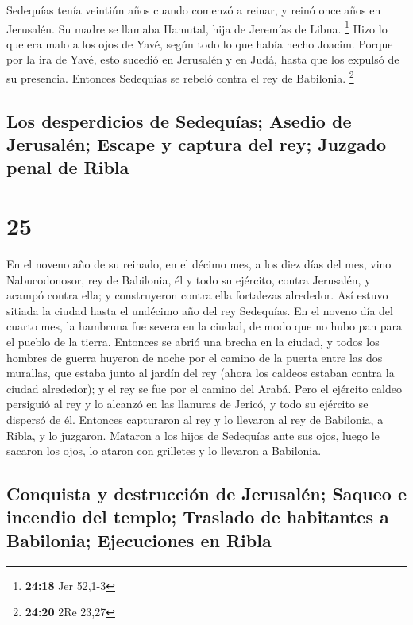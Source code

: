  Sedequías tenía veintiún años cuando comenzó a reinar, y
reinó once años en Jerusalén. Su madre se llamaba Hamutal, hija de
Jeremías de Libna. \footnote{\textbf{24:18} Jer 52,1-3} 
Hizo lo que era malo a los ojos de Yavé, según todo lo que había hecho
Joacim.  Porque por la ira de Yavé, esto sucedió en
Jerusalén y en Judá, hasta que los expulsó de su presencia. Entonces
Sedequías se rebeló contra el rey de Babilonia. \footnote{\textbf{24:20}
  2Re 23,27}

\hypertarget{los-desperdicios-de-sedequuxedas-asedio-de-jerusaluxe9n-escape-y-captura-del-rey-juzgado-penal-de-ribla}{%
\subsection{Los desperdicios de Sedequías; Asedio de Jerusalén; Escape y
captura del rey; Juzgado penal de
Ribla}\label{los-desperdicios-de-sedequuxedas-asedio-de-jerusaluxe9n-escape-y-captura-del-rey-juzgado-penal-de-ribla}}

\hypertarget{section-24}{%
\section{25}\label{section-24}}

 En el noveno año de su reinado, en el décimo mes, a los
diez días del mes, vino Nabucodonosor, rey de Babilonia, él y todo su
ejército, contra Jerusalén, y acampó contra ella; y construyeron contra
ella fortalezas alrededor.  Así estuvo sitiada la ciudad
hasta el undécimo año del rey Sedequías.  En el noveno día
del cuarto mes, la hambruna fue severa en la ciudad, de modo que no hubo
pan para el pueblo de la tierra.  Entonces se abrió una
brecha en la ciudad, y todos los hombres de guerra huyeron de noche por
el camino de la puerta entre las dos murallas, que estaba junto al
jardín del rey (ahora los caldeos estaban contra la ciudad alrededor); y
el rey se fue por el camino del Arabá.  Pero el ejército
caldeo persiguió al rey y lo alcanzó en las llanuras de Jericó, y todo
su ejército se dispersó de él.  Entonces capturaron al rey
y lo llevaron al rey de Babilonia, a Ribla, y lo juzgaron.
 Mataron a los hijos de Sedequías ante sus ojos, luego le
sacaron los ojos, lo ataron con grilletes y lo llevaron a Babilonia.

\hypertarget{conquista-y-destrucciuxf3n-de-jerusaluxe9n-saqueo-e-incendio-del-templo-traslado-de-habitantes-a-babilonia-ejecuciones-en-ribla}{%
\subsection{Conquista y destrucción de Jerusalén; Saqueo e incendio del
templo; Traslado de habitantes a Babilonia; Ejecuciones en
Ribla}\label{conquista-y-destrucciuxf3n-de-jerusaluxe9n-saqueo-e-incendio-del-templo-traslado-de-habitantes-a-babilonia-ejecuciones-en-ribla}}

